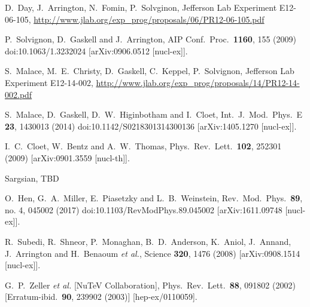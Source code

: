 \documentclass[twocolumn]{revtex4}
\begin{document}
\begin{thebibliography}{25}
  D.~Day, J.~Arrington, N.~Fomin, P.~Solvginon, Jefferson Lab Experiment E12-06-105,
  \url{http://www.jlab.org/exp_prog/proposals/06/PR12-06-105.pdf}

  P.~Solvignon, D.~Gaskell and J.~Arrington,
  AIP Conf.\ Proc.\  {\bf 1160}, 155 (2009)
  doi:10.1063/1.3232024
  [arXiv:0906.0512 [nucl-ex]].

  S.~Malace, M.~E.~Christy, D.~Gaskell, C.~Keppel, P.~Solvignon, Jefferson Lab Experiment E12-14-002,
  \url{http://www.jlab.org/exp_prog/proposals/14/PR12-14-002.pdf}
  
        S.~Malace, D.~Gaskell, D.~W.~Higinbotham and I.~Cloet,
        Int.\ J.\ Mod.\ Phys.\ E {\bf 23}, 1430013 (2014)
        doi:10.1142/S0218301314300136
        [arXiv:1405.1270 [nucl-ex]].


        I.~C.~Cloet, W.~Bentz and A.~W.~Thomas,
        Phys.\ Rev.\ Lett.\  {\bf 102}, 252301 (2009)
        [arXiv:0901.3559 [nucl-th]].


     Sargsian, TBD

        O.~Hen, G.~A.~Miller, E.~Piasetzky and L.~B.~Weinstein,
        Rev.\ Mod.\ Phys.\  {\bf 89}, no. 4, 045002 (2017)
        doi:10.1103/RevModPhys.89.045002
        [arXiv:1611.09748 [nucl-ex]].

        R.~Subedi, R.~Shneor, P.~Monaghan, B.~D.~Anderson, K.~Aniol, J.~Annand, J.~Arrington and H.~Benaoum {\it et al.},
        Science {\bf 320}, 1476 (2008)
        [arXiv:0908.1514 [nucl-ex]].



        G.~P.~Zeller {\it et al.}  [NuTeV Collaboration],
        Phys.\ Rev.\ Lett.\  {\bf 88}, 091802 (2002)
        [Erratum-ibid.\  {\bf 90}, 239902 (2003)]
        [hep-ex/0110059].


\end{thebibliography}
\end{document}
